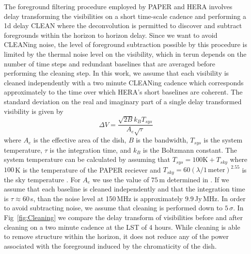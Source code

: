 \documentclass[twocolumn]{emulateapj}
\begin{document}
The foreground filtering procedure employed by PAPER and HERA involves delay transforming the visibilities on a short time-scale cadence and performing a 1d delay CLEAN where the deconvolution is permitted to discover and subtract foregrounds within the horizon to horizon delay. Since we want to avoid CLEANing noise, the level of foreground subtraction possible by this procedure is limited by the thermal noise level on the visibility, which in terun depends on the number of time steps and redundant baselines that are averaged before performing the cleaning step. In this work, we assume that each visibility is cleaned independently with a two minute CLEANing cadence which corresponds approximately to the time over which HERA's short baselines are coherent. The standard deviation on the real and imaginary part of a single delay transformed visibility is given by \citep{Morales:2004}
\begin{equation}
\Delta V = \frac{\sqrt{2 B} k_B T_{sys}}{A_e \sqrt{\tau}}
\end{equation}
where $A_e$ is the effective area of the dish, $B$ is the bandwidth, $T_{sys}$ is the system temperature, $\tau$ is the integration time, and $k_B$ is the Boltzmann constant. The system temperature can be calculated by assuming that $T_{sys} = 100\text{K} + T_{sky}$ where $100$\,K is the temperature of the PAPER reciever and $T_{sky} = 60 (\lambda/1\,\text{meter} )^{2.55}$ is the sky temperature \citep{Fixsen:2008}. For $A_e$ we use the value of $75$\,m determined in \citep{Neben:2015b}. If we assume that each baseline is cleaned independently and that the integration time is $\tau \approx 60$\,s, than the noise level at 150\,MHz is approximately $9.9$\,Jy\,MHz. In order to avoid subtracting noise, we assume that cleaning is performed down to $5\,\sigma$. In Fig~\ref{fig:Cleaning} we compare the delay transform of visibilities before and after cleaning on a two minute cadence at the LST of 4 hours. While cleaning is able to remove structure within the horizon, it does not reduce any of the power associated with the foreground induced by the chromaticity of the dish. 
\end{document}
